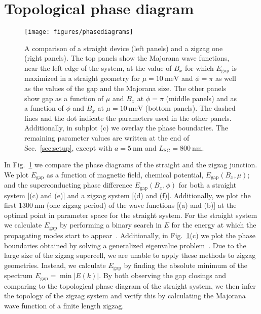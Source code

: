 \documentclass[english, twocolumn, 10pt, aps, superscriptaddress, floatfix, prb, citeautoscript]{revtex4-1}
\renewcommand{\comment}[2]{#2}
\begin{document}
\section{Topological phase diagram}

\begin{figure}[!htb]
\texttt{[image: figures/phasediagrams]}
\caption{A comparison of a straight device (left panels) and a zigzag one (right panels).
The top panels show the Majorana wave functions, near the left edge of the system, at the value of $B_x$ for which $E_\textrm{gap}$ is maximized in a straight geometry for $\mu=\SI{10}{\meV}$ and $\phi=\pi$ as well as the values of the gap and the Majorana size.
The other panels show gap as a function of $\mu$ and $B_x$ at $\phi=\pi$ (middle panels) and as a function of $\phi$ and $B_x$ at $\mu=\SI{10}{\meV}$ (bottom panels).
The dashed lines and the dot indicate the parameters used in the other panels.
Additionally, in subplot (c) we overlay the phase boundaries.
The remaining parameter values are written at the end of Sec.~\ref{sec:setup}, except with $a=\SI{5}{\nm}$ and $L_\textrm{SC}=\SI{800}{\nm}$.
\label{fig:phasediagrams}}
\end{figure}

\comment{We calculate the topological phase diagram using the gap size.}
In Fig.~\ref{fig:phasediagrams} we compare the phase diagrams of the straight and the zigzag junction.
We plot $E_\textrm{gap}$ as a function of magnetic field, chemical potential, $E_\textrm{gap}(B_x, \mu)$; and the superconducting phase difference $E_\textrm{gap}(B_x, \phi)$ for both a straight system [(c) and (e)] and a zigzag system [(d) and (f)].
Additionally, we plot the first $\SI{1300}{\nm}$ (one zigzag period) of the wave functions [(a) and (b)] at the optimal point in parameter space for the straight system.
For the straight system we calculate $E_\textrm{gap}$ by performing a binary search in $E$ for the energy at which the propagating modes start to appear~\cite{nijholt2015orbital}.
Additionally, in Fig.~\ref{fig:phasediagrams}(c) we plot the phase boundaries obtained by solving a generalized eigenvalue problem~\cite{nijholt2015orbital}.
Due to the large size of the zigzag supercell, we are unable to apply these methods to zigzag geometries.
Instead, we calculate $E_\textrm{gap}$ by finding the absolute minimum of the spectrum $E_\textrm{gap}=\min{\left|E(k)\right|}$.
By both observing the gap closings and comparing to the topological phase diagram of the straight system, we then infer the topology of the zigzag system and verify this by calculating the Majorana wave function of a finite length zigzag.
\end{document}

